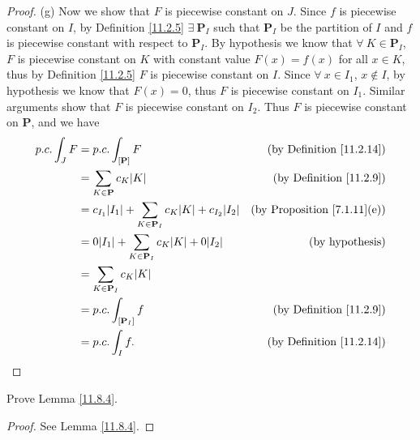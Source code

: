 \begin{proof}{(g)}
    Now we show that \(F\) is piecewise constant on \(J\).
    Since \(f\) is piecewise constant on \(I\), by Definition \ref{11.2.5} \(\exists\ \mathbf{P}_I\) such that \(\mathbf{P}_I\) be the partition of \(I\) and \(f\) is piecewise constant with respect to \(\mathbf{P}_I\).
    By hypothesis we know that \(\forall\ K \in \mathbf{P}_I\), \(F\) is piecewise constant on \(K\) with constant value \(F(x) = f(x)\) for all \(x \in K\), thus by Definition \ref{11.2.5} \(F\) is piecewise constant on \(I\).
    Since \(\forall\ x \in I_1\), \(x \notin I\), by hypothesis we know that \(F(x) = 0\), thus \(F\) is piecewise constant on \(I_1\).
    Similar arguments show that \(F\) is piecewise constant on \(I_2\).
    Thus \(F\) is piecewise constant on \(\mathbf{P}\), and we have
    \begin{align*}
        p.c. \int_J F & = p.c. \int_{[\mathbf{P}]} F                                                       & \text{(by Definition \ref{11.2.14})}    \\
                      & = \sum_{K \in \mathbf{P}} c_K \abs*{K}                                             & \text{(by Definition \ref{11.2.9})}     \\
                      & = c_{I_1} \abs*{I_1} + \sum_{K \in \mathbf{P}_I} c_K \abs*{K} + c_{I_2} \abs*{I_2} & \text{(by Proposition \ref{7.1.11}(e))} \\
                      & = 0 \abs*{I_1} + \sum_{K \in \mathbf{P}_I} c_K \abs*{K} + 0 \abs*{I_2}             & \text{(by hypothesis)}                  \\
                      & = \sum_{K \in \mathbf{P}_I} c_K \abs*{K}                                                                                     \\
                      & = p.c. \int_{[\mathbf{P}_I]} f                                                     & \text{(by Definition \ref{11.2.9})}     \\
                      & = p.c. \int_I f.                                                                   & \text{(by Definition \ref{11.2.14})}
    \end{align*}
\end{proof}

\exercisesection

\begin{exercise}\label{ex 11.8.1}
    Prove Lemma \ref{11.8.4}.
\end{exercise}

\begin{proof}
    See Lemma \ref{11.8.4}.
\end{proof}

